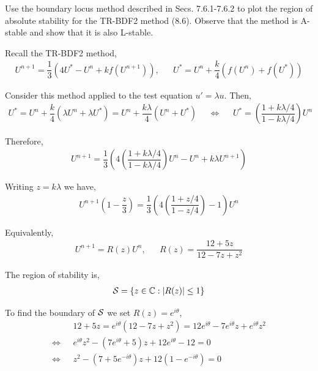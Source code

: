 \documentclass[10pt]{article}
\begin{document}
\begin{problem}[Problem 3]
Use the boundary locus method described in Secs. 7.6.1-7.6.2 to plot the region of absolute stability for the TR-BDF2 method (8.6).  Observe that the method is A-stable and show that it is also L-stable.
\end{problem}

\begin{solution}[Solution]

Recall the TR-BDF2 method,
\begin{align*}
    U^{n+1} = \dfrac{1}{3}\left( 4U^*-U^n+kf(U^{n+1}) \right), &&
    U^* = U^n + \dfrac{k}{4}\left( f(U^n)+f(U^*) \right)
\end{align*}

Consider this method applied to the test equation \( u' = \lambda u \). Then,
\begin{align*}
    U^* = U^n + \dfrac{k}{4}(\lambda U^n + \lambda U^*) = U^n + \dfrac{k\lambda}{4}(U^n + U^*)
    && \Longleftrightarrow &&
    U^* = \left(\dfrac{1+k\lambda/4}{1-k\lambda/4}\right)U^n
\end{align*}

Therefore,
\begin{align*}
    U^{n+1} = \dfrac{1}{3} \left( 4\left(\dfrac{1+k\lambda/4}{1-k\lambda/4}\right)U^n - U^n + k\lambda U^{n+1}\right)
\end{align*}

Writing \( z = k\lambda \) we have,
\begin{align*}
    U^{n+1}\left( 1-\dfrac{z}{3} \right) = \dfrac{1}{3} \left( 4\left(\dfrac{1+z/4}{1-z/4}\right) - 1 \right) U^n
\end{align*}

Equivalently,
\begin{align*}
    U^{n+1} = R(z) U^n, && R(z) = \dfrac{12+5z}{12-7z+z^2}
\end{align*}

The region of stability is,
\begin{align*}
    \mathcal{S} = \{z\in\mathbb{C} : |R(z)| \leq 1\}
\end{align*}

To find the boundary of \( \mathcal{S} \) we set \( R(z) = e^{i\theta} \),
\begin{align*}
    &12+5z = e^{i\theta} \left( 12-7z+z^2 \right) = 12e^{i\theta} - 7e^{i\theta}z + e^{i\theta}z^2
    \\ \Longleftrightarrow ~~~&
    e^{i\theta}z^2 - (7e^{i\theta}+5)z + 12e^{i\theta}-12 = 0
    \\ \Longleftrightarrow ~~~&
    z^2 - (7+5e^{-i\theta})z + 12(1-e^{-i\theta}) = 0
\end{align*}


\end{solution}
\end{document}
